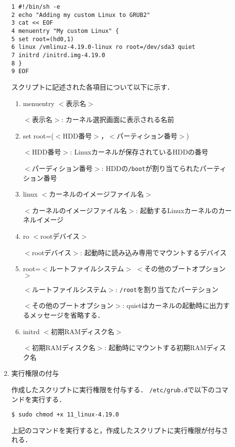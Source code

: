 \documentclass[12pt]{jsarticle}
\begin{document}
\begin{enumerate}
\begin{enumerate}
\begin{verbatim}
1 #!/bin/sh -e
2 echo "Adding my custom Linux to GRUB2"
3 cat << EOF
4 menuentry "My custom Linux" {
5 set root=(hd0,1)
6 linux /vmlinuz-4.19.0-linux ro root=/dev/sda3 quiet
7 initrd /initrd.img-4.19.0
8 }
9 EOF
\end{verbatim}
スクリプトに記述された各項目について以下に示す．

\begin{enumerate}
\item menuentry $<$表示名$>$

  $<$表示名$>$: カーネル選択画面に表示される名前
  
\item set root=($<$HDD番号$>$，$<$パーティション番号$>$)

  $<$HDD番号$>$: Linuxカーネルが保存されているHDDの番号
  
  $<$パーディション番号$>$: HDDの\verb|/boot|が割り当てられたパーティション番号
  
\item linux $<$カーネルのイメージファイル名$>$

  $<$カーネルのイメージファイル名$>$: 起動するLinuxカーネルのカーネルイメージ
  
\item ro $<$rootデバイス$>$

  $<$rootデバイス$>$: 起動時に読み込み専用でマウントするデバイス

\item root=$<$ルートファイルシステム$>$ $<$その他のブートオプション$>$

  $<$ルートファイルシステム$>$: \verb|/root|を割り当てたパーテション

  $<$その他のブートオプション$>$: quietはカーネルの起動時に出力するメッセージを省略する．

\item initrd $<$初期RAMディスク名$>$

  $<$初期RAMディスク名$>$: 起動時にマウントする初期RAMディスク名
  
\end{enumerate}

\item 実行権限の付与

  作成したスクリプトに実行権限を付与する．
  \verb|/etc/grub.d|で以下のコマンドを実行する．
\begin{verbatim}
$ sudo chmod +x 11_linux-4.19.0
\end{verbatim}
上記のコマンドを実行すると，作成したスクリプトに実行権限が付与される．


\end{enumerate}
\end{enumerate}
\end{document}
